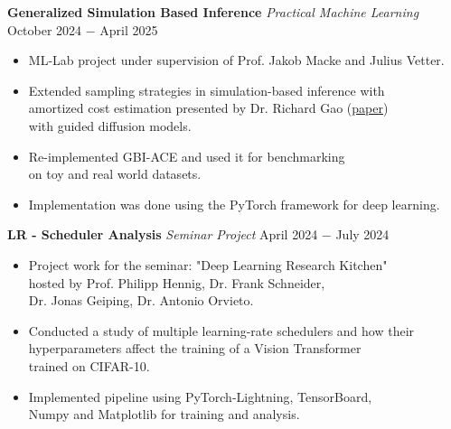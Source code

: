 \documentclass{article}
\begin{document}
\noindent \textbf{Generalized Simulation Based Inference} \textit{Practical Machine Learning} 
\href{https://github.com/mackelab/neuralgbi_diffusion}{\faGithubSquare} \hfill October 2024 $-$ April 2025
\begin{itemize}[noitemsep,nolistsep,leftmargin=*]
    \item ML-Lab project under supervision of Prof. Jakob Macke and Julius Vetter.
    \item Extended sampling strategies in simulation-based inference with \\
    amortized cost estimation presented by Dr. Richard Gao (\href{https://arxiv.org/abs/2305.15208}{paper}) \\
    with guided diffusion models.
    \item Re-implemented GBI-ACE and used it for benchmarking \\ 
    on toy and real world datasets.
    \item Implementation was done using the PyTorch framework for deep learning.\\
\end{itemize}

\noindent \textbf{LR - Scheduler Analysis} \textit{Seminar Project} \href{https://github.com/RobinU434/LRSchedulerAnalysis}{\faGithubSquare}\hfill April 2024 $-$ July 2024
\begin{itemize}[noitemsep,nolistsep,leftmargin=*]
    \item Project work for the seminar: "Deep Learning Research Kitchen" \\ 
    hosted by Prof. Philipp Hennig, Dr. Frank Schneider, \\
    Dr. Jonas Geiping, Dr. Antonio Orvieto.
    \item Conducted a study of multiple learning-rate schedulers and how their \\
    hyperparameters affect the training of a Vision Transformer \\
    trained on CIFAR-10.
    \item Implemented pipeline using PyTorch-Lightning, TensorBoard, \\
    Numpy and Matplotlib for training and analysis. \\ 
\end{itemize}
\end{document}
